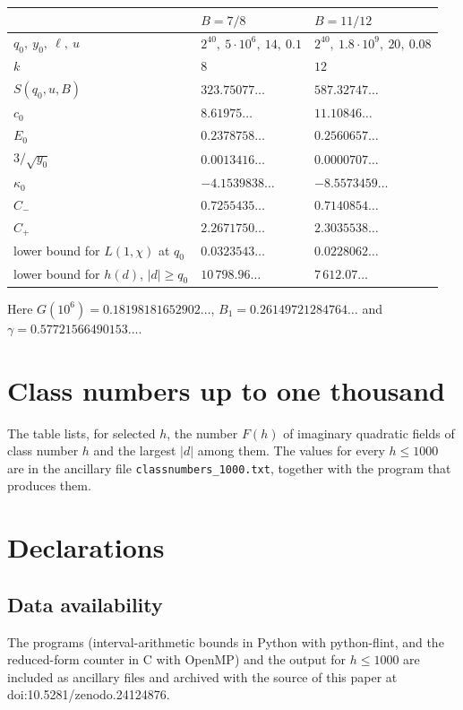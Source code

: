\documentclass[11pt]{amsart}
\theoremstyle{definition}
\theoremstyle{remark}
\begin{document}
\begin{center}
\begin{tabular}{@{}lll@{}}
\toprule
 & $B=7/8$ & $B=11/12$\\
\midrule
$q_0,\ y_0,\ \ell,\ u$ & $2^{40},\ 5\cdot10^6,\ 14,\ 0.1$ & $2^{40},\ 1.8\cdot10^9,\ 20,\ 0.08$\\
$k$ & $8$ & $12$\\
$S(q_0,u,B)$ & $323.75077\ldots$ & $587.32747\ldots$\\
$c_0$ & $8.61975\ldots$ & $11.10846\ldots$\\
$E_0$ & $0.2378758\ldots$ & $0.2560657\ldots$\\
$3/\sqrt{y_0}$ & $0.0013416\ldots$ & $0.0000707\ldots$\\
$\kappa_0$ & $-4.1539838\ldots$ & $-8.5573459\ldots$\\
$C_-$ & $0.7255435\ldots$ & $0.7140854\ldots$\\
$C_+$ & $2.2671750\ldots$ & $2.3035538\ldots$\\
lower bound for $L(1,\chi)$ at $q_0$ & $0.0323543\ldots$ & $0.0228062\ldots$\\
lower bound for $h(d)$, $|d|\ge q_0$ & $10\,798.96\ldots$ & $7\,612.07\ldots$\\
\bottomrule
\end{tabular}
\end{center}

\noindent Here $G(10^6)=0.18198181652902\ldots$, $B_1=0.26149721284764\ldots$ and $\gamma=0.57721566490153\ldots$.

\section{Class numbers up to one thousand}\label{app:data}

The table lists, for selected $h$, the number $F(h)$ of imaginary quadratic fields of class number $h$ and the largest $|d|$ among them. The values for every $h\le1000$ are in the ancillary file \texttt{classnumbers\_1000.txt}, together with the program that produces them.



\section*{Declarations}

\subsection*{Data availability} The programs (interval-arithmetic bounds in Python with python-flint, and the reduced-form counter in C with OpenMP) and the output for $h\le1000$ are included as ancillary files and archived with the source of this paper at doi:10.5281/zenodo.24124876.
\end{document}
